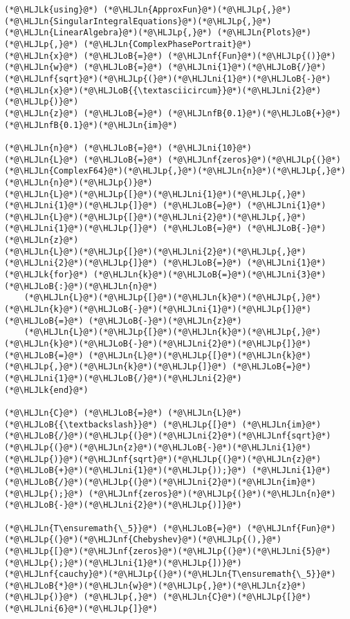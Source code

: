 \documentclass[12pt,a4paper]{article}
\newcommand{\HLJLk}[1]{\textcolor[RGB]{148,91,176}{\textbf{#1}}}
\newcommand{\HLJLn}[1]{#1}
\newcommand{\HLJLnf}[1]{\textcolor[RGB]{66,102,213}{#1}}
\newcommand{\HLJLnfB}[1]{\textcolor[RGB]{59,151,46}{#1}}
\newcommand{\HLJLni}[1]{\textcolor[RGB]{59,151,46}{#1}}
\newcommand{\HLJLoB}[1]{\textcolor[RGB]{102,102,102}{\textbf{#1}}}
\newcommand{\HLJLp}[1]{#1}
\begin{document}
\begin{lstlisting}
(*@\HLJLk{using}@*) (*@\HLJLn{ApproxFun}@*)(*@\HLJLp{,}@*) (*@\HLJLn{SingularIntegralEquations}@*)(*@\HLJLp{,}@*) (*@\HLJLn{LinearAlgebra}@*)(*@\HLJLp{,}@*) (*@\HLJLn{Plots}@*)(*@\HLJLp{,}@*) (*@\HLJLn{ComplexPhasePortrait}@*)
(*@\HLJLn{x}@*) (*@\HLJLoB{=}@*) (*@\HLJLnf{Fun}@*)(*@\HLJLp{()}@*)
(*@\HLJLn{w}@*) (*@\HLJLoB{=}@*) (*@\HLJLni{1}@*)(*@\HLJLoB{/}@*)(*@\HLJLnf{sqrt}@*)(*@\HLJLp{(}@*)(*@\HLJLni{1}@*)(*@\HLJLoB{-}@*)(*@\HLJLn{x}@*)(*@\HLJLoB{{\textasciicircum}}@*)(*@\HLJLni{2}@*)(*@\HLJLp{)}@*)
(*@\HLJLn{z}@*) (*@\HLJLoB{=}@*) (*@\HLJLnfB{0.1}@*)(*@\HLJLoB{+}@*)(*@\HLJLnfB{0.1}@*)(*@\HLJLn{im}@*)

(*@\HLJLn{n}@*) (*@\HLJLoB{=}@*) (*@\HLJLni{10}@*)
(*@\HLJLn{L}@*) (*@\HLJLoB{=}@*) (*@\HLJLnf{zeros}@*)(*@\HLJLp{(}@*)(*@\HLJLn{ComplexF64}@*)(*@\HLJLp{,}@*)(*@\HLJLn{n}@*)(*@\HLJLp{,}@*)(*@\HLJLn{n}@*)(*@\HLJLp{)}@*)
(*@\HLJLn{L}@*)(*@\HLJLp{[}@*)(*@\HLJLni{1}@*)(*@\HLJLp{,}@*)(*@\HLJLni{1}@*)(*@\HLJLp{]}@*) (*@\HLJLoB{=}@*) (*@\HLJLni{1}@*)
(*@\HLJLn{L}@*)(*@\HLJLp{[}@*)(*@\HLJLni{2}@*)(*@\HLJLp{,}@*)(*@\HLJLni{1}@*)(*@\HLJLp{]}@*) (*@\HLJLoB{=}@*) (*@\HLJLoB{-}@*)(*@\HLJLn{z}@*)
(*@\HLJLn{L}@*)(*@\HLJLp{[}@*)(*@\HLJLni{2}@*)(*@\HLJLp{,}@*)(*@\HLJLni{2}@*)(*@\HLJLp{]}@*) (*@\HLJLoB{=}@*) (*@\HLJLni{1}@*)
(*@\HLJLk{for}@*) (*@\HLJLn{k}@*)(*@\HLJLoB{=}@*)(*@\HLJLni{3}@*)(*@\HLJLoB{:}@*)(*@\HLJLn{n}@*)
    (*@\HLJLn{L}@*)(*@\HLJLp{[}@*)(*@\HLJLn{k}@*)(*@\HLJLp{,}@*)(*@\HLJLn{k}@*)(*@\HLJLoB{-}@*)(*@\HLJLni{1}@*)(*@\HLJLp{]}@*) (*@\HLJLoB{=}@*) (*@\HLJLoB{-}@*)(*@\HLJLn{z}@*)
    (*@\HLJLn{L}@*)(*@\HLJLp{[}@*)(*@\HLJLn{k}@*)(*@\HLJLp{,}@*)(*@\HLJLn{k}@*)(*@\HLJLoB{-}@*)(*@\HLJLni{2}@*)(*@\HLJLp{]}@*) (*@\HLJLoB{=}@*) (*@\HLJLn{L}@*)(*@\HLJLp{[}@*)(*@\HLJLn{k}@*)(*@\HLJLp{,}@*)(*@\HLJLn{k}@*)(*@\HLJLp{]}@*) (*@\HLJLoB{=}@*) (*@\HLJLni{1}@*)(*@\HLJLoB{/}@*)(*@\HLJLni{2}@*)
(*@\HLJLk{end}@*)

(*@\HLJLn{C}@*) (*@\HLJLoB{=}@*) (*@\HLJLn{L}@*) (*@\HLJLoB{{\textbackslash}}@*) (*@\HLJLp{[}@*) (*@\HLJLn{im}@*)(*@\HLJLoB{/}@*)(*@\HLJLp{(}@*)(*@\HLJLni{2}@*)(*@\HLJLnf{sqrt}@*)(*@\HLJLp{(}@*)(*@\HLJLn{z}@*)(*@\HLJLoB{-}@*)(*@\HLJLni{1}@*)(*@\HLJLp{)}@*)(*@\HLJLnf{sqrt}@*)(*@\HLJLp{(}@*)(*@\HLJLn{z}@*)(*@\HLJLoB{+}@*)(*@\HLJLni{1}@*)(*@\HLJLp{));}@*) (*@\HLJLni{1}@*)(*@\HLJLoB{/}@*)(*@\HLJLp{(}@*)(*@\HLJLni{2}@*)(*@\HLJLn{im}@*)(*@\HLJLp{);}@*) (*@\HLJLnf{zeros}@*)(*@\HLJLp{(}@*)(*@\HLJLn{n}@*)(*@\HLJLoB{-}@*)(*@\HLJLni{2}@*)(*@\HLJLp{)]}@*)

(*@\HLJLn{T\ensuremath{\_5}}@*) (*@\HLJLoB{=}@*) (*@\HLJLnf{Fun}@*)(*@\HLJLp{(}@*)(*@\HLJLnf{Chebyshev}@*)(*@\HLJLp{(),}@*) (*@\HLJLp{[}@*)(*@\HLJLnf{zeros}@*)(*@\HLJLp{(}@*)(*@\HLJLni{5}@*)(*@\HLJLp{);}@*)(*@\HLJLni{1}@*)(*@\HLJLp{])}@*)
(*@\HLJLnf{cauchy}@*)(*@\HLJLp{(}@*)(*@\HLJLn{T\ensuremath{\_5}}@*)(*@\HLJLoB{*}@*)(*@\HLJLn{w}@*)(*@\HLJLp{,}@*)(*@\HLJLn{z}@*)(*@\HLJLp{)}@*) (*@\HLJLp{,}@*) (*@\HLJLn{C}@*)(*@\HLJLp{[}@*)(*@\HLJLni{6}@*)(*@\HLJLp{]}@*)
\end{lstlisting}
\end{document}
